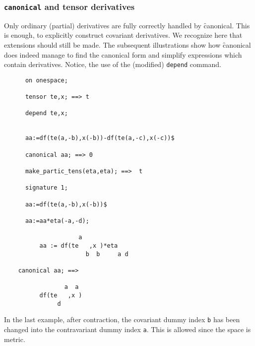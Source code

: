 \subsubsection{\texttt{canonical} and tensor derivatives}

Only ordinary (partial) derivatives are fully correctly handled
by \f{canonical}. This is enough, to explicitly construct covariant
derivatives. We recognize here  that extensions should still be made.
The subsequent illustrations show how \f{canonical} does indeed
manage to find  the canonical form and simplify  expressions
which contain derivatives. Notice, the use of
the (modified) \texttt{depend} command.
\begin{verbatim}
      on onespace;

      tensor te,x; ==> t

      depend te,x;


      aa:=df(te(a,-b),x(-b))-df(te(a,-c),x(-c))$

      canonical aa; ==> 0

      make_partic_tens(eta,eta); ==>  t

      signature 1;

      aa:=df(te(a,-b),x(-b))$

      aa:=aa*eta(-a,-d);

                     a
          aa := df(te   ,x )*eta
                       b  b     a d

    canonical aa; ==>

                 a  a
          df(te   ,x )
               d
\end{verbatim}
In the last example, after contraction, the covariant dummy index \texttt{b}
has been changed into the contravariant dummy index \texttt{a}. This is allowed
since the space is metric.
